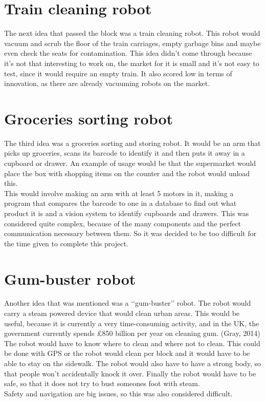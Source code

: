 \documentclass[11pt,twoside,a4paper]{report}
\begin{document}
\section{Train cleaning robot}
The next idea that passed the block was a train cleaning robot. This robot would vacuum and scrub the floor of the train carriages, empty garbage bins and maybe even check the seats for contamination. 
This idea didn\rq{}t come through because it\rq{}s not that interesting to work on, the market for it is small and it\rq{}s not easy to test, since it would require an empty train. It also scored low in terms of innovation, as there are already vacuuming robots on the market.

\section{Groceries sorting robot}
The third idea was a groceries sorting and storing robot. It would be an arm that picks up groceries, scans its barcode to identify it and then puts it away in a cupboard or drawer. An example of usage would be that the supermarket would place the box with shopping items on the counter and the robot would unload this. \\
This would involve making an arm with at least 5 motors in it, making a program that compares the barcode to one in a database to find out what product it is and a vision system to identify cupboards and drawers. This was considered quite complex, because of the many components and the perfect communication necessary between them. So it was decided to be too difficult for the time given to complete this project.

\section{Gum-buster robot}
Another idea that was mentioned was a \lq\lq{}gum-buster\rq\rq{} robot. The robot would carry a steam powered device that would clean urban areas. This would be useful, because it is currently a very time-consuming activity, and in the UK, the government currently spends £850 billion per year on cleaning gum. (Gray, 2014) \\
The robot would have to know where to clean and where not to clean. This could be done with GPS or the robot would clean per block and it would have to be able to stay on the sidewalk. The robot would also have to have a strong body, so that people won\rq{}t accidentally knock it over. Finally the robot would have to be safe, so that it does not try to bust someones foot with steam. \\
Safety and navigation are big issues, so this was also considered difficult.
\end{document}
